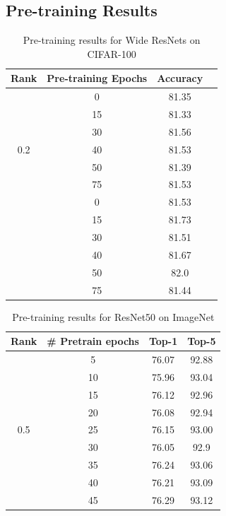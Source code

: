 \documentclass{article}
\begin{document}
\subsection{Pre-training Results}
\begin{table}[H]
\centering
\begin{tabular}{|c|c|c|c}
\hline
\textbf{Rank} & \textbf{Pre-training Epochs} &  \textbf{Accuracy}\\
\hline\hline
\multirow{7}{*}{0.2} & 0 & 81.35 \\
                     & 15 & 81.33 \\ 
                     & 30 & 81.56 \\
                     & 40 & 81.53 \\
                     & 50 & 81.39 \\
                     & 75 & 81.53 \\
                     
\hline
\multirow{7}{*}{0.3} & 0 & 81.53 \\
                     & 15 & 81.73 \\ 
                     & 30 & 81.51 \\
                     & 40 & 81.67 \\
                     & 50 & 82.0 \\
                     & 75 & 81.44 \\
\hline
\end{tabular}
\caption{Pre-training results for Wide ResNets on CIFAR-100}
\label{pretrain:cifar100}
\end{table}
\begin{table}[H]
\centering
\begin{tabular}{|c|c|c|c|}
\hline
\textbf{Rank} & \textbf{\# Pretrain epochs} &  \textbf{Top-1} & \textbf{Top-5} \\
\hline\hline
\multirow{9}{*}{0.5} & 5 & 76.07 & 92.88 \\
                     & 10 & 75.96 & 93.04 \\
                     & 15 & 76.12 & 92.96 \\ 
                     & 20 & 76.08 & 92.94 \\
                     & 25 & 76.15 & 93.00 \\
                     & 30 & 76.05 & 92.9 \\
                     & 35 & 76.24 & 93.06 \\
                     & 40 & 76.21 & 93.09 \\
                     & 45 & 76.29 & 93.12 \\
\hline
\end{tabular}
\caption{Pre-training results for ResNet50 on ImageNet}
\label{pretrain:imagenet}
\end{table}
\end{document}

